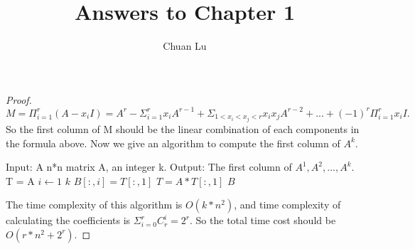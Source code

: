 \documentclass[12pt]{article}
\newenvironment{problem}[2][Problem]{\begin{trivlist}
\item[\hskip \labelsep {\bfseries #1}\hskip \labelsep {\bfseries #2.}]}{\end{trivlist}}
\begin{document}
 
\title{Answers to Chapter 1}
\author{Chuan Lu}
\maketitle
 
\begin{problem}{Page 13, P1.1.1}
\end{problem}
 
\begin{proof}
$M = \Pi_{i=1}^{r}(A-x_{i}I)=A^r-\Sigma_{i=1}^{r}x_{i}A^{r-1}+\Sigma_{1<x_i<x_j<r}x_ix_jA^{r-2}+...+(-1)^r\Pi_{i=1}^{r}x_iI.$\\
So the first column of M should be the linear combination of each components in the formula above. Now we give an algorithm to compute the first column of $A^k$.
\begin{codebox}
\zi Input: A n*n matrix A, an integer k.
\zi Output: The first column of $A^1, A^2, ..., A^k$.
\li T = A
\li \For $i \gets 1$ \To $k$
\li 	\Do
			$B[:, i] = T[:, 1]$
\li			$T = A*T[:, 1]$
		\End
\li \Return $B$
\end{codebox}
The time complexity of this algorithm is $O(k*n^2)$, and time complexity of calculating the coefficients is $\Sigma_{i=0}^{r}C_{r}^{i} = 2^r$. So the total time cost should be $O(r*n^2+2^r)$.
\end{proof}
\end{document}
